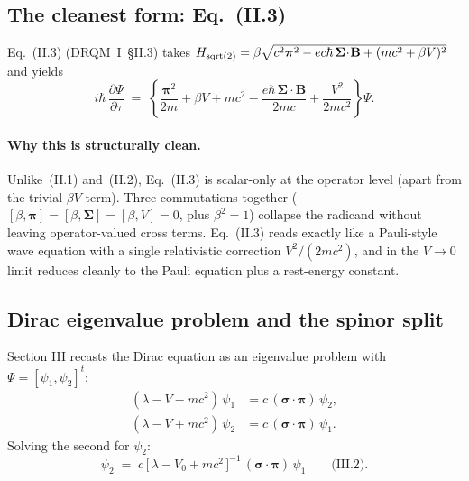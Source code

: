 \subsection{The cleanest form: Eq.~(II.3)}

Eq.~(II.3) (DRQM~I~\S II.3) takes
$H_{\rm sqrt(2)} = \beta\sqrt{c^2\boldsymbol\pi^2
- e c \hbar\,\boldsymbol\Sigma\!\cdot\!\mathbf{B}
+ (m c^2 + \beta V)^2}$
and yields
\begin{equation}
\label{eq:II3-clean}
i\hbar\,\frac{\partial\Psi}{\partial\tau} \;=\;
\left\{\frac{\boldsymbol\pi^2}{2 m}
 + \beta V
 + m c^2
 - \frac{e\hbar\,\boldsymbol\Sigma\!\cdot\!\mathbf{B}}{2 m c}
 + \frac{V^2}{2 m c^2}\right\}\Psi.
\end{equation}

\paragraph{Why this is structurally clean.}
Unlike~(II.1) and~(II.2), Eq.~(II.3) is scalar-only at the operator level
(apart from the trivial $\beta V$ term). Three commutations together
($[\beta, \boldsymbol\pi] = [\beta, \boldsymbol\Sigma] = [\beta, V] = 0$,
plus $\beta^2 = 1$) collapse the radicand without leaving operator-valued
cross terms. Eq.~(II.3) reads exactly like a Pauli-style wave equation with
a single relativistic correction $V^2/(2 m c^2)$, and in the
$V \to 0$ limit reduces cleanly to the Pauli equation plus a rest-energy
constant. 

\subsection{Dirac eigenvalue problem and the spinor split}

Section III recasts the Dirac equation as an eigenvalue problem with
$\Psi = [\psi_1, \psi_2]^t$:
\begin{align}
\label{eq:III1}
(\lambda - V - m c^2)\,\psi_1 &= c\,(\boldsymbol\sigma\!\cdot\!\boldsymbol\pi)\,\psi_2,\\
(\lambda - V + m c^2)\,\psi_2 &= c\,(\boldsymbol\sigma\!\cdot\!\boldsymbol\pi)\,\psi_1.
\nonumber
\end{align}
Solving the second for $\psi_2$:
\begin{equation}
\label{eq:III2}
\psi_2 \;=\; c\,\bigl[\,\lambda - V_0 + m c^2\,\bigr]^{-1}\,
            (\boldsymbol\sigma\!\cdot\!\boldsymbol\pi)\,\psi_1
\qquad\text{(III.2).}
\end{equation}

